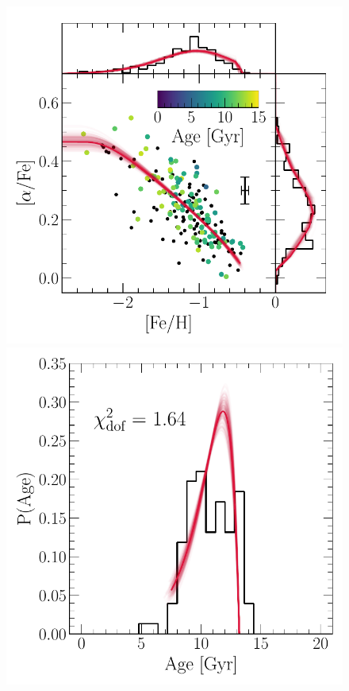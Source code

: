 \documentclass[ms.tex]{subfiles}
\begin{document}
\begin{figure}
\includegraphics[scale = 0.5]{gsefit_afe_feh.pdf}
\includegraphics[scale = 0.42]{gsefit_agedist.pdf}

\end{figure}
\end{document}
